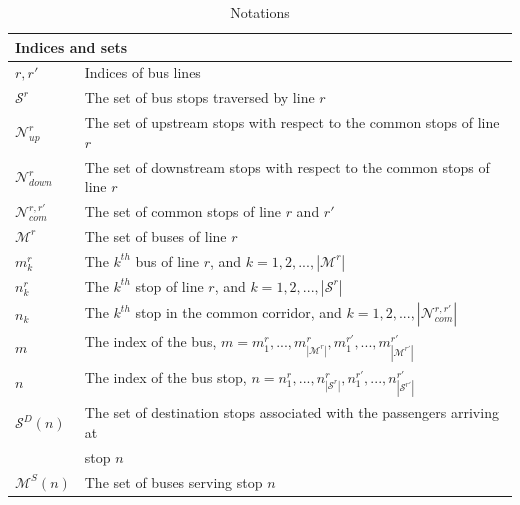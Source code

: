 \documentclass[smallextended]{svjour3}       %
\begin{document}
\begin{Abstract}
\begin{table}[H]
  \caption{\textup{Notations}}
  \label{tab:Notations}
  \begin{tabular}{p{1.5cm}p{8.5cm}}
      \hline
      \multicolumn{2}{l}{Indices and sets }                                                                                 \\ \hline
      $r,r'$                          & Indices of bus lines                                                                \\ 
      $\mathcal{S}^{r}$               & The set of bus stops traversed by line $r$                                          \\ 
      $\mathcal{N}_{up}^{r}$          & The set of upstream stops with respect to the common stops of line $r$              \\ 
      $\mathcal{N}_{down}^{r}$        & The set of downstream stops with respect to the common stops of line $r$            \\ 
      $\mathcal{N}_{com}^{r,r'}$      & The set of common stops of line $r$ and $r'$                                        \\ 
      $\mathcal{M}^{r}$               & The set of buses of line $r$                                                        \\ 
      $m_{k}^{r}$                     & The $k^{th}$ bus of line $r$, and $k=1,2,...,\left|\mathcal{M}^{r}\right|$          \\ 
      $n_{k}^{r}$                     & The $k^{th}$ stop of line $r$, and $k=1,2,...,\left|\mathcal{S}^{r}\right|$         \\ 
      $n_{k}$                         & The $k^{th}$ stop in the common corridor, and $k=1,2,...,\left|\mathcal{N}_{com}^{r,r'}\right|$\\ 
      $m$                             & The index of the bus, $m=m_{1}^{r},...,m_{\left|\mathcal{M}^{r}\right|}^{r},m_{1}^{r'},...,m_{\left|\mathcal{M}^{r'}\right|}^{r'}$      \\ 
      $n$                             & The index of the bus stop, $n=n_{1}^{r},...,n_{\left|\mathcal{S}^{r}\right|}^{r},n_{1}^{r'},...,n_{\left|\mathcal{S}^{r'}\right|}^{r'}$ \\ 
      $\mathcal{S}^{D}(n)$            & The set of destination stops associated with the passengers arriving at\\ & stop $n$    \\ 
      $\mathcal{M}^{S}(n)$            & The set of buses serving stop $n$                                                   \\ 

\end{tabular}
\end{table}
\end{Abstract}
\end{document}
